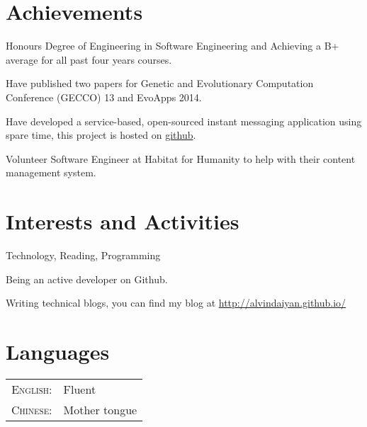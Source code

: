 \documentclass[a4paper,10pt]{article} %
\begin{document}

\section{Achievements}

Honours Degree of Engineering in Software Engineering and Achieving a B+ average for all past four years courses.

Have published two papers for Genetic and Evolutionary Computation Conference (GECCO) 13 and EvoApps 2014.

Have developed a service-based, open-sourced instant messaging application using spare time, this project is hosted on \href{https://github.com/alvindaiyan/goTalk}{github}.

 Volunteer Software Engineer at Habitat for Humanity to help with their content management system.


\section{Interests and Activities}
Technology, Reading, Programming

Being an active developer on Github.

Writing technical blogs, you can find my blog at \href{http://alvindaiyan.github.io/}{http://alvindaiyan.github.io/}


\section{Languages}

\begin{tabular}{rl}
\textsc{English:} & Fluent\\

\textsc{Chinese:} & Mother tongue\\
\end{tabular}
\end{document}
